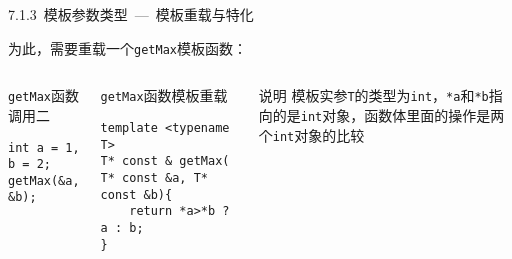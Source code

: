 \begin{frame}[fragile]{7.1.3~模板参数类型\normalsize{~---~模板重载与特化}}

为此，需要\alert{重载}一个\texttt{getMax}模板函数：

\vspace{-4mm}

\begin{columns}[t]

\begin{blueblock}{\texttt{getMax}函数调用二}
\begin{lstlisting}[moreemph={T}]
int a = 1, b = 2;
getMax(&a, &b);
\end{lstlisting}
\end{blueblock}
\begin{blueblock}{\texttt{getMax}函数模板重载}
\begin{lstlisting}[moreemph={T}]
template <typename T>
T* const & getMax( T* const &a, T* const &b){
    return *a>*b ? a : b;
}
\end{lstlisting}
\end{blueblock}

\begin{yellowblock}{说明}
模板实参\texttt{T}的类型为\texttt{int}，\texttt{*a}和\texttt{*b}指向的是\texttt{int}对象，函数体里面的操作是两个\texttt{int}对象的比较
\end{yellowblock}

\end{columns}

\end{frame}



